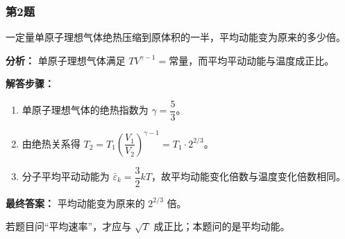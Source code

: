 \documentclass[12pt,a4paper]{ctexart}
\begin{document}
\subsubsection*{第2题}
\begin{tcolorbox}[colback=gray!2!white,colframe=black!60,title={题目}]
一定量单原子理想气体绝热压缩到原体积的一半，平均动能变为原来的多少倍。\par
\end{tcolorbox}
\begin{tcolorbox}[colback=blue!2!white,colframe=blue!55!black,title={完整答案}]
\textbf{分析：}
单原子理想气体满足 \(TV^{\gamma-1}=\text{常量}\)，而平均平动动能与温度成正比。\par
\textbf{解答步骤：}
\begin{enumerate}
\item 单原子理想气体的绝热指数为 \(\gamma=\dfrac53\)。
\item 由绝热关系得 \(T_2=T_1\left(\dfrac{V_1}{V_2}\right)^{\gamma-1}=T_1\cdot 2^{2/3}\)。
\item 分子平均平动动能为 \(\bar\varepsilon_k=\dfrac32 kT\)，故平均动能变化倍数与温度变化倍数相同。
\end{enumerate}
\textbf{最终答案：}
平均动能变为原来的 \(2^{2/3}\) 倍。\par
\end{tcolorbox}
\begin{tcolorbox}[colback=red!2!white,colframe=red!55!black,title={易错点}]
若题目问“平均速率”，才应与 \(\sqrt{T}\) 成正比；本题问的是平均动能。\par
\end{tcolorbox}
\end{document}
